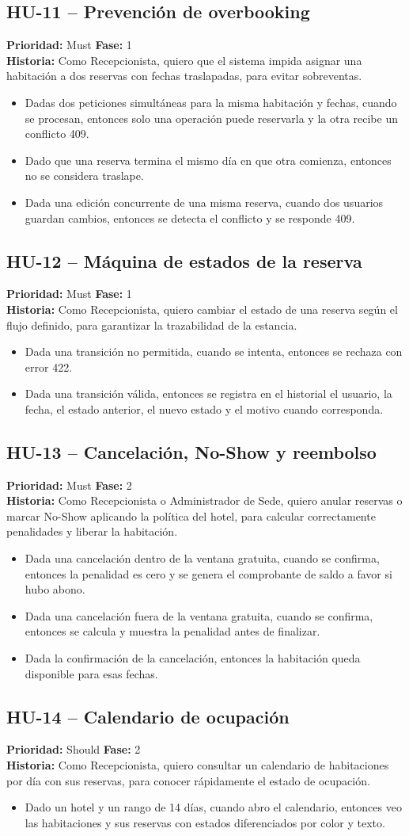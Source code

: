 \documentclass[12pt,a4paper]{article}
\newcommand{\HU}[5]{%
  \subsection*{#1 -- #2}
  \noindent\textbf{Prioridad:} #3 \hfill \textbf{Fase:} #4\\
  \noindent\textbf{Historia:} #5
  \vspace{2mm}
}
\begin{document}
\HU{HU-11}{Prevención de overbooking}{Must}{1}{Como Recepcionista, quiero que el sistema impida asignar una habitación a dos reservas con fechas traslapadas, para evitar sobreventas.}
\begin{itemize}
  \item Dadas dos peticiones simultáneas para la misma habitación y fechas, cuando se procesan, entonces solo una operación puede reservarla y la otra recibe un conflicto 409.
  \item Dado que una reserva termina el mismo día en que otra comienza, entonces no se considera traslape.
  \item Dada una edición concurrente de una misma reserva, cuando dos usuarios guardan cambios, entonces se detecta el conflicto y se responde 409.
\end{itemize}

\HU{HU-12}{Máquina de estados de la reserva}{Must}{1}{Como Recepcionista, quiero cambiar el estado de una reserva según el flujo definido, para garantizar la trazabilidad de la estancia.}
\begin{itemize}
  \item Dada una transición no permitida, cuando se intenta, entonces se rechaza con error 422.
  \item Dada una transición válida, entonces se registra en el historial el usuario, la fecha, el estado anterior, el nuevo estado y el motivo cuando corresponda.
\end{itemize}

\HU{HU-13}{Cancelación, No-Show y reembolso}{Must}{2}{Como Recepcionista o Administrador de Sede, quiero anular reservas o marcar No-Show aplicando la política del hotel, para calcular correctamente penalidades y liberar la habitación.}
\begin{itemize}
  \item Dada una cancelación dentro de la ventana gratuita, cuando se confirma, entonces la penalidad es cero y se genera el comprobante de saldo a favor si hubo abono.
  \item Dada una cancelación fuera de la ventana gratuita, cuando se confirma, entonces se calcula y muestra la penalidad antes de finalizar.
  \item Dada la confirmación de la cancelación, entonces la habitación queda disponible para esas fechas.
\end{itemize}

\HU{HU-14}{Calendario de ocupación}{Should}{2}{Como Recepcionista, quiero consultar un calendario de habitaciones por día con sus reservas, para conocer rápidamente el estado de ocupación.}
\begin{itemize}
  \item Dado un hotel y un rango de 14 días, cuando abro el calendario, entonces veo las habitaciones y sus reservas con estados diferenciados por color y texto.
\end{itemize}
\end{document}
